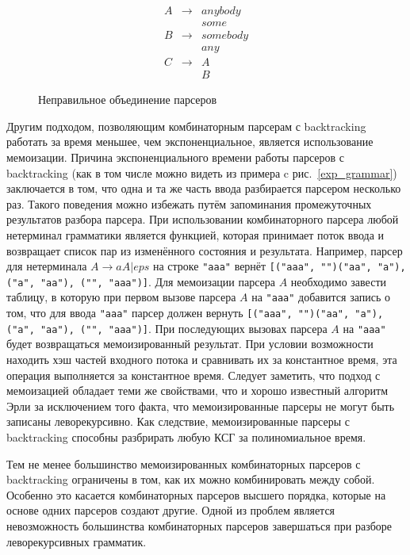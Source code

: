 \documentclass[times]{itmo-student-thesis}
\begin{document}
\begin{figure}[!h]
    \caption{Неправильное объединение парсеров}\label{uncomposable_grammar}
    \[
        \begin{array}{lll}
            A & \to & anybody \\
              &     & some  \\
            B & \to & somebody \\
              &     & any  \\
            C & \to & A  \\
              &     & B
        \end{array}
    \]
\end{figure}

Другим подходом, позволяющим комбинаторным парсерам с backtracking работать за время меньшее, чем экспоненциальное,
является использование мемоизации. Причина экспоненциального времени работы парсеров с backtracking (как в том числе
можно видеть из примера c рис.~\ref{exp_grammar}) заключается в том, что одна и та же часть ввода разбирается
парсером несколько раз. Такого поведения можно избежать путём запоминания промежуточных результатов разбора парсера.
При использовании комбинаторного парсера любой нетерминал грамматики является функцией, которая принимает поток ввода и
возвращает список пар из изменённого состояния и результата. Например, парсер для нетерминала $A \to aA | eps$ на
строке \lstinline{"aaa"} вернёт \lstinline{[("aaa", "")("aa", "a"), ("a", "aa"), ("", "aaa")]}. Для мемоизации парсера
$A$ необходимо завести таблицу, в которую при первом вызове парсера $A$ на
\lstinline{"aaa"} добавится запись о том, что для ввода \lstinline{"aaa"} парсер должен вернуть
\lstinline{[("aaa", "")("aa", "a"), ("a", "aa"), ("", "aaa")]}. При последующих вызовах парсера $A$ на \lstinline{"aaa"}
будет возвращаться мемоизированный результат. При условии возможности находить хэш частей входного потока и сравнивать
их за константное время, эта операция выполняется за константное время. Следует заметить, что подход с мемоизацией
обладает теми же свойствами, что и хорошо известный алгоритм Эрли\cite{norvig_techniques_1991} за исключением того факта, что
мемоизированные парсеры не могут быть записаны леворекурсивно. Как следствие, мемоизированные парсеры с backtracking
способны разбрирать любую КСГ за полиномиальное время.

Тем не менее большинство мемоизированных комбинаторных парсеров с backtracking ограничены в том, как их можно
комбинировать между собой. Особенно это касается комбинаторных парсеров высшего порядка, которые на основе одних
парсеров создают другие. Одной из проблем является невозможность большинства комбинаторных парсеров завершаться при
разборе леворекурсивных грамматик.
\end{document}

